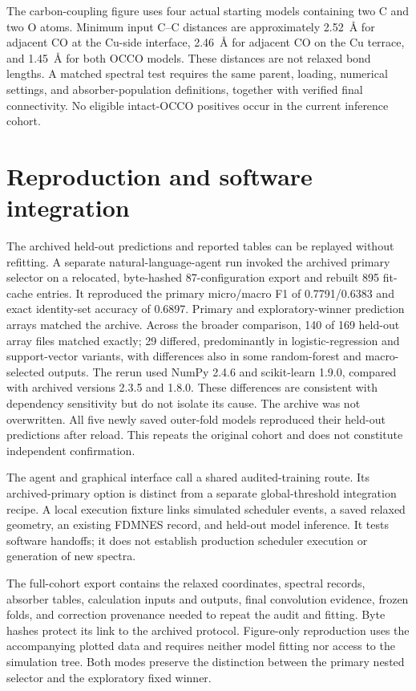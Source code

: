 \documentclass[11pt,a4paper]{article}
\begin{document}
The carbon-coupling figure uses four actual starting models containing two C and two O atoms. Minimum input C--C distances are approximately 2.52~\AA{} for adjacent CO at the Cu-side interface, 2.46~\AA{} for adjacent CO on the Cu terrace, and 1.45~\AA{} for both OCCO models. These distances are not relaxed bond lengths. A matched spectral test requires the same parent, loading, numerical settings, and absorber-population definitions, together with verified final connectivity. No eligible intact-OCCO positives occur in the current inference cohort.


\section{Reproduction and software integration}
The archived held-out predictions and reported tables can be replayed without refitting. A separate natural-language-agent run invoked the archived primary selector on a relocated, byte-hashed 87-configuration export and rebuilt 895 fit-cache entries. It reproduced the primary micro/macro F1 of 0.7791/0.6383 and exact identity-set accuracy of 0.6897. Primary and exploratory-winner prediction arrays matched the archive. Across the broader comparison, 140 of 169 held-out array files matched exactly; 29 differed, predominantly in logistic-regression and support-vector variants, with differences also in some random-forest and macro-selected outputs. The rerun used NumPy 2.4.6 and scikit-learn 1.9.0, compared with archived versions 2.3.5 and 1.8.0. These differences are consistent with dependency sensitivity but do not isolate its cause. The archive was not overwritten. All five newly saved outer-fold models reproduced their held-out predictions after reload. This repeats the original cohort and does not constitute independent confirmation.

The agent and graphical interface call a shared audited-training route. Its archived-primary option is distinct from a separate global-threshold integration recipe. A local execution fixture links simulated scheduler events, a saved relaxed geometry, an existing FDMNES record, and held-out model inference. It tests software handoffs; it does not establish production scheduler execution or generation of new spectra.

The full-cohort export contains the relaxed coordinates, spectral records, absorber tables, calculation inputs and outputs, final convolution evidence, frozen folds, and correction provenance needed to repeat the audit and fitting. Byte hashes protect its link to the archived protocol. Figure-only reproduction uses the accompanying plotted data and requires neither model fitting nor access to the simulation tree. Both modes preserve the distinction between the primary nested selector and the exploratory fixed winner.
\end{document}
